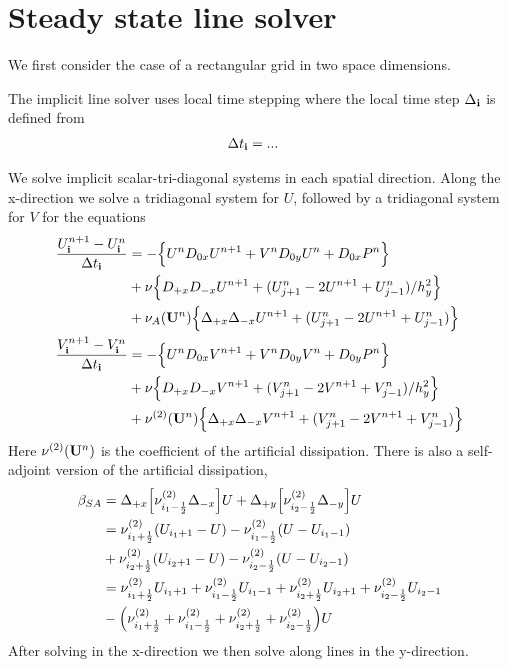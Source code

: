 \section{Steady state line solver}

We first consider the case of a rectangular grid in two space dimensions.

The implicit line solver uses local time stepping where the local time step $\Delta_{\mathbf{ i}}$
is defined from 
\begin{align*}
   \Delta t_{\mathbf{ i}} &= ...
\end{align*}

\newcommand{\nuA}{\nu^{(2)}}

We solve implicit scalar-tri-diagonal systems in each spatial direction. 
Along the x-direction we solve a tridiagonal system for $U$, followed by a tridiagonal
system for $V$ for the equations 
\begin{align*}
U_\iv^{n+1} - U_\iv^n \over \Delta t_\iv &=
 -\Big\{ U^n D_{0x} U^{n+1} + V^n D_{0y} U^n + D_{0x} P^n \Big\} \\
 &+ \nu\Big\{ D_{+x}D_{-x} U^{n+1} + (U_{j+1}^n -2U^{n+1} + U_{j-1}^n )/ h_y^2 \Big\} \\
 &+ \nu_A(\Uv^n) \Big\{ \Delta_{+x}\Delta_{-x} U^{n+1} + (U_{j+1}^n -2U^{n+1} + U_{j-1}^n ) \Big\} \\
V_\iv^{n+1} - V_\iv^n \over \Delta t_\iv &=
 -\Big\{ U^n D_{0x} V^{n+1} + V^n D_{0y} V^n + D_{0y} P^n \Big\} \\
 &+ \nu\Big\{ D_{+x}D_{-x} V^{n+1} + (V_{j+1}^n -2V^{n+1} + V_{j-1}^n )/ h_y^2 \Big\} \\
 &+ \nuA(\Uv^n) \Big\{ \Delta_{+x}\Delta_{-x} V^{n+1} + (V_{j+1}^n -2V^{n+1} + V_{j-1}^n ) \Big\} \\
\end{align*}
Here $\nuA(\Uv^n)$ is the coefficient of the artificial dissipation.
There is also a self-adjoint version of the artificial dissipation,
\begin{align*}
 \beta_{SA} &=   \Delta_{+x}\Big[\nuA_{i_1-\half} \Delta_{-x}\Big] U 
               + \Delta_{+y}\Big[\nuA_{i_2-\half} \Delta_{-y}\Big] U \\
            &= \nuA_{i_1+\half}(U_{i_1+1}-U) - \nuA_{i_1-\half}(U-U_{i_1-1}) \\
            &  +\nuA_{i_2+\half}(U_{i_2+1}-U) - \nuA_{i_2-\half}(U-U_{i_2-1}) \\
            &= \nuA_{i_1+\half}U_{i_1+1} + \nuA_{i_1-\half}U_{i_1-1} 
                 + \nuA_{i_2+\half}U_{i_2+1} +\nuA_{i_2-\half}U_{i_2-1} \\
            & - \Big(\nuA_{i_1+\half}+\nuA_{i_1-\half}+\nuA_{i_2+\half}+\nuA_{i_2-\half}\Big) U
\end{align*}
After solving in the x-direction we then solve along lines in the y-direction.


